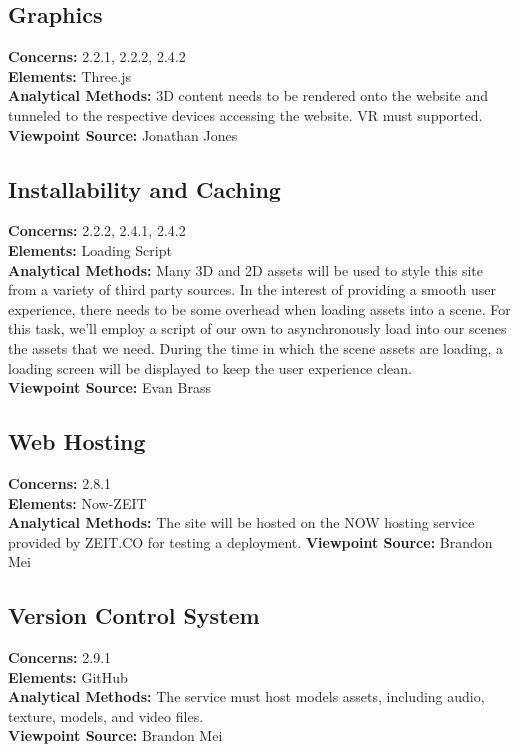 \documentclass[onecolumn, draftclsnofoot,10pt, compsoc]{IEEEtran}
\begin{document}
\subsection{Graphics}
\textbf{Concerns:} 2.2.1, 2.2.2, 2.4.2\\
\textbf{Elements:} Three.js\\
\textbf{Analytical Methods:} 3D content needs to be rendered onto the website and tunneled to the respective devices accessing the website. VR must supported.\\
\textbf{Viewpoint Source:} Jonathan Jones

\subsection{Installability and Caching}
\textbf{Concerns:} 2.2.2, 2.4.1, 2.4.2\\
\textbf{Elements:} Loading Script\\
\textbf{Analytical Methods:} Many 3D and 2D assets will be used to style this site from a variety of third party sources. In the interest of providing a smooth user experience, there needs to be some overhead when loading assets into a scene. For this task, we'll employ a script of our own to asynchronously load into our scenes the assets that we need. During the time in which the scene assets are loading, a loading screen will be displayed to keep the user experience clean.\\
\textbf{Viewpoint Source:} Evan Brass

\subsection{Web Hosting}
\textbf{Concerns:} 2.8.1\\
\textbf{Elements:} Now-ZEIT\\
\textbf{Analytical Methods:} The site will be hosted on the NOW hosting service provided by ZEIT.CO for testing a deployment.
\textbf{Viewpoint Source:} Brandon Mei

\subsection{Version Control System}
\textbf{Concerns:} 2.9.1\\
\textbf{Elements:} GitHub\\
\textbf{Analytical Methods:} The service must host models assets, including audio, texture, models, and video files.\\
\textbf{Viewpoint Source:} Brandon Mei
\end{document}
